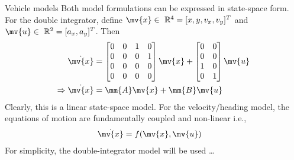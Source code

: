\begin{frame}{Vehicle models}
	Both model formulations can be expressed in state-space form. For the double integrator, define $\mv{x} \in\ \mathbb{R}^4 = [x,y,v_x,v_y]^T$ and $\mv{u}\in\ \mathbb{R}^2 = [a_x,a_y]^T$. Then
	\begin{align*}
	\dot{\mv{x}} &= 
	\begin{bmatrix}
	0 & 0 & 1 & 0\\
	0 & 0 & 0 & 1\\
	0 & 0 & 0 & 0\\
	0 & 0 & 0 & 0\\
	\end{bmatrix}
	\mv{x} +
	\begin{bmatrix}
	0 & 0\\
	0 & 0\\
	1 & 0\\
	0 & 1
	\end{bmatrix}
	\mv{u}\\
	\Rightarrow \dot{\mv{x}} &= \mm{A}\mv{x}+\mm{B}\mv{u}
	\end{align*}
	Clearly, this is a linear state-space model. For the velocity/heading model, the equations of motion are fundamentally coupled and non-linear i.e.,
	\begin{align*}
	\dot{\mv{x}} &= f(\mv{x},\mv{u})
	\end{align*}
	For simplicity, the double-integrator model will be used \ldots
\end{frame}

